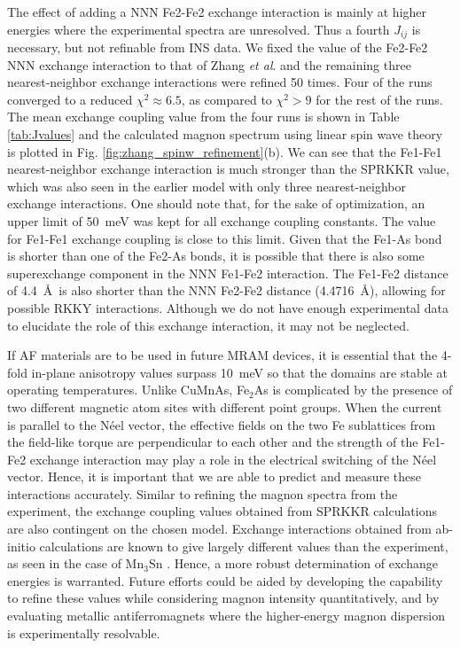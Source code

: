 \documentclass[10pt,doublespacing,edeposit]{uiucthesis2020}
\begin{document}
\begin{mainmatter}
The effect of adding a NNN Fe2-Fe2 exchange interaction is mainly at higher energies where the experimental spectra are unresolved. Thus a fourth $J_{ij}$ is necessary, but not refinable from INS data. We fixed the value of the Fe2-Fe2 NNN exchange interaction to that of Zhang \emph{et al}. \cite{Zhang2013} and the remaining three nearest-neighbor exchange interactions were refined 50 times. Four of the runs converged to a reduced $\chi^2 \approx 6.5$, as compared to $\chi^2 > 9$ for the rest of the runs. The mean exchange coupling value from the four runs is shown in Table \ref{tab:Jvalues} and the calculated magnon spectrum using linear spin wave theory is plotted in Fig. \ref{fig:zhang_spinw_refinement}(b). We can see that the Fe1-Fe1 nearest-neighbor exchange interaction is much stronger than the SPRKKR value, which was also seen in the earlier model with only three nearest-neighbor exchange interactions. One should note that, for the sake of optimization, an upper limit of 50~meV was kept for all exchange coupling constants. The value for Fe1-Fe1 exchange coupling is close to this limit. Given that the Fe1-As bond is shorter than one of the Fe2-As bonds, it is possible that there is also some superexchange component in the NNN Fe1-Fe2 interaction. The Fe1-Fe2 distance of 4.4~\AA\ is also shorter than the NNN Fe2-Fe2 distance (4.4716~\AA), allowing for possible RKKY interactions. Although we do not have enough experimental data to elucidate the role of this exchange interaction, it may not be neglected.

If AF materials are to be used in future MRAM devices, it is essential that the 4-fold in-plane anisotropy values surpass 10~meV so that the domains are stable at operating temperatures. Unlike CuMnAs, Fe$_2$As is complicated by the presence of two different magnetic atom sites with different point groups. When the current is parallel to the N\'eel vector, the effective fields on the two Fe sublattices from the field-like torque are perpendicular to each other and the strength of the Fe1-Fe2 exchange interaction may play a role in the electrical switching of the N\'{e}el vector. Hence, it is important that we are able to predict and measure these interactions accurately. Similar to refining the magnon spectra from the experiment, the exchange coupling values obtained from SPRKKR calculations are also contingent on the chosen model. Exchange interactions obtained from ab-initio calculations are known to give largely different values than the experiment, as seen in the case of Mn$_3$Sn \cite{Park2018}. Hence, a more robust determination of exchange energies is warranted. Future efforts could be aided by developing the capability to refine these values while considering magnon intensity quantitatively, and by evaluating metallic antiferromagnets where the higher-energy magnon dispersion is experimentally resolvable. 



\end{mainmatter}
\end{document}
